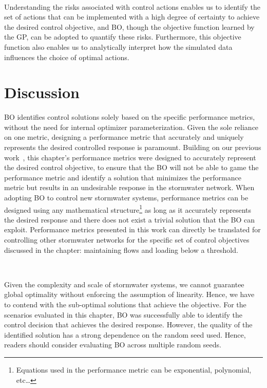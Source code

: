 \

Understanding the risks associated with control actions enables us to identify the set of actions that can be implemented with a high degree of certainty to achieve the desired control objective, and BO, though the objective function learned by the GP, can be adopted to quantify these risks. 
Furthermore, this objective function also enables us to analytically interpret how the simulated data influences the  choice of optimal actions.

\section{Discussion}
BO identifies control solutions solely based on the specific performance metrics, without the need for internal optimizer parameterization.
Given the sole reliance on one metric, designing a performance metric that accurately and uniquely represents the desired controlled response is paramount.
Building on our previous work~\cite{Mullapudi_Lewis_Gruden_Kerkez_2020}, this chapter's performance metrics were designed to accurately represent the desired control objective, to ensure that the BO will not be able to game the performance metric and identify a solution that minimizes the performance metric but results in an undesirable response in the stormwater network.
When adopting BO to control new stormwater systems, performance metrics can be designed using any mathematical structure\footnote{Equations used in the performance metric can be exponential, polynomial, etc\ldots} as long as it accurately represents the desired response and there does not exist a trivial solution that the BO can exploit.
Performance metrics presented in this work can directly be translated for controlling other stormwater networks for the specific set of control objectives discussed in the chapter: maintaining flows and loading below a threshold.

\

Given the complexity and scale of stormwater systems, we cannot guarantee global optimality without enforcing the assumption of linearity. 
Hence, we have to contend with the sub-optimal solutions that achieve the objective. 
For the scenarios evaluated in this chapter, BO was successfully able to identify the control decision that achieves the desired response.
However, the quality of the identified solution has a strong dependence on the random seed used.
Hence, readers should consider evaluating BO across multiple random seeds.

